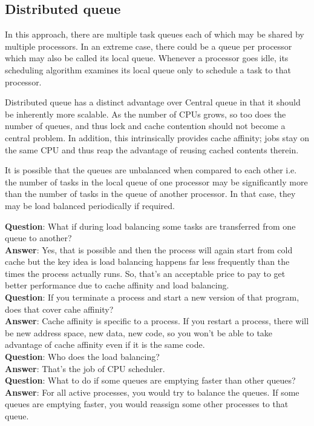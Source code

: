 \documentclass[twoside]{article}
\begin{document}
\subsection{Distributed queue}
In this approach, there are multiple task queues each of which may be shared by multiple processors. In an extreme case, there could be a queue per processor which may also be called its local queue. Whenever a processor goes idle, its scheduling algorithm examines its local queue only to schedule a task to that processor.

Distributed queue has a distinct advantage over Central queue in that it should be inherently
more scalable. As the number of CPUs grows, so too does the number
of queues, and thus lock and cache contention should not become a
central problem. In addition, this intrinsically provides cache affinity;
jobs stay on the same CPU and thus reap the advantage of reusing cached
contents therein.

It is possible that the queues are unbalanced when compared to each other i.e. the number of tasks in the local queue of one processor may be significantly more than the number of tasks in the queue of another processor. In that case, they may be load balanced periodically if required. 

\textbf{Question}: What if during load balancing some tasks are transferred from one queue to another?\\
\textbf{Answer}: Yes, that is possible and then the process will again start from cold cache but the key idea is load balancing happens far less frequently than the times the process actually runs. So, that's an acceptable price to pay to get better performance due to cache affinity and load balancing. \\

\textbf{Question}: If you terminate a process and start a new version of that program, does that cover cahe affinity?\\
\textbf{Answer}: Cache affinity is specific to a process. If you restart a process,  there will be new address space, new data, new code, so you won't be able to take advantage of cache affinity even if it is the same code. \\

\textbf{Question}: Who does the load balancing?\\
\textbf{Answer}: That's the job of CPU scheduler.\\

\textbf{Question}: What to do if some queues are emptying faster than other queues?\\
\textbf{Answer}: For all active processes, you would try to balance the queues. If some queues are emptying faster, you would reassign some other processes to that queue. \\
\end{document}
